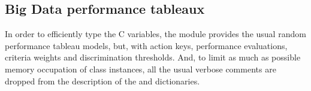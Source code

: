\documentclass[a4paper,12pt,english]{sphinxhowto}
\begin{document}
\subsection{Big Data performance tableaux}
\label{\detokenize{tutorial:big-data-performance-tableaux}}
In order to efficiently type the C variables, the  module provides the usual random performance tableau models, but, with  action keys,  performance evaluations,  criteria weights and  discrimination thresholds. And, to limit as much as possible memory occupation of class instances, all the usual verbose comments are dropped from the description of the  and  dictionaries.
\end{document}

